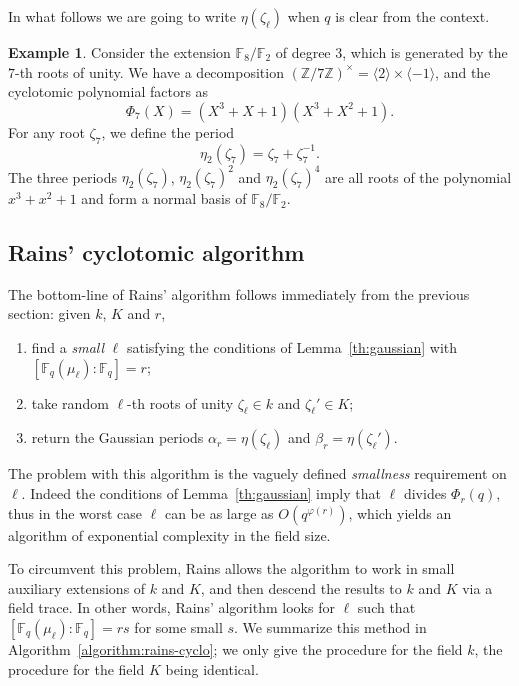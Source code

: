\documentclass[12pt]{article}
\theoremstyle{plain}
\theoremstyle{definition}
\newtheorem{example}[theorem]{Example}
\def\Z{\ensuremath{\mathbb{Z}}}
\def\F{\ensuremath{\mathbb{F}}}
\def\euler{\ensuremath{\varphi}}
\newcounter{algorithm}
\begin{document}
In what follows we are going to write $\eta(\zeta_\ell)$ when $q$ is
clear from the context.

\begin{example} 
  Consider the extension $\F_8/\F_2$ of degree $3$, which is generated
  by the $7$-th roots of unity. We have a decomposition
  $(\Z/7\Z)^\times=\langle 2\rangle\times\langle-1\rangle$, and the
  cyclotomic polynomial factors as
  \begin{equation}
    \Phi_7(X) = (X^3 + X + 1) (X^3 + X^2 + 1).
  \end{equation}
  For any root $\zeta_7$, we define the period
  \begin{equation}
    \eta_2(\zeta_7) = \zeta_7+\zeta_7^{-1}.
  \end{equation}
  The three periods $\eta_2(\zeta_7)$, $\eta_2(\zeta_7)^2$ and
  $\eta_2(\zeta_7)^4$ are all roots of the polynomial $x^3+x^2+1$ and
  form a normal basis of $\F_8/\F_2$.
\end{example}

\subsection{Rains' cyclotomic algorithm}

The bottom-line of Rains' algorithm follows immediately from the
previous section: given $k$, $K$ and $r$,
\begin{enumerate}
\item find a \emph{small} $\ell$ satisfying the conditions of
  Lemma~\ref{th:gaussian} with $[\F_q(\mu_\ell):\F_q]=r$;
\item take random $\ell$-th roots of unity $\zeta_\ell\in k$ and
  $\zeta_\ell'\in K$;
\item return the Gaussian periods $\alpha_r=\eta(\zeta_\ell)$ and
  $\beta_r=\eta(\zeta_\ell')$.
\end{enumerate}

The problem with this algorithm is the vaguely defined
\emph{smallness} requirement on $\ell$. Indeed the conditions of
Lemma~\ref{th:gaussian} imply that $\ell$ divides $\Phi_r(q)$, thus in
the worst case $\ell$ can be as large as $O(q^{\euler(r)})$, which
yields an algorithm of exponential complexity in the field size.

To circumvent this problem, Rains allows the algorithm to work in
small auxiliary extensions of $k$ and $K$, and then descend the
results to $k$ and $K$ via a field trace. In other words, Rains'
algorithm looks for $\ell$ such that $[\F_q(\mu_\ell):\F_q]=rs$ for
some small $s$. We summarize this method in
Algorithm~\ref{algorithm:rains-cyclo}; we only give the procedure for
the field $k$, the procedure for the field $K$ being identical.
\end{document}
